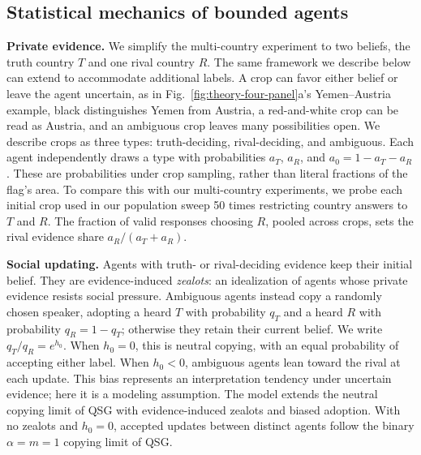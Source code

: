 \subsection[Statistical mechanics of bounded agents]{Statistical mechanics of bounded agents}
\label{sec:stat-mech}


\textbf{Private evidence.} We simplify the multi-country experiment to two beliefs, the truth country \(T\) and one rival country \(R\). The same framework we describe below can extend to accommodate additional labels. A crop can favor either belief or leave the agent uncertain, as in Fig.~\ref{fig:theory-four-panel}a's Yemen--Austria example, black distinguishes Yemen from Austria, a red-and-white crop can be read as Austria, and an ambiguous crop leaves many possibilities open. We describe crops as three types: truth-deciding, rival-deciding, and ambiguous. Each agent independently draws a type with probabilities \(a_T\), \(a_R\), and \(a_0=1-a_T-a_R\). These are probabilities under crop sampling, rather than literal fractions of the flag's area. To compare this with our multi-country experiments, we probe each initial crop used in our population sweep 50 times restricting country answers to \(T\) and \(R\). The fraction of valid responses choosing \(R\), pooled across crops, sets the rival evidence share \(a_R/(a_T+a_R)\).

\textbf{Social updating.} Agents with truth- or rival-deciding evidence keep their initial belief. They are evidence-induced \emph{zealots}: an idealization of agents whose private evidence resists social pressure. Ambiguous agents instead copy a randomly chosen speaker, adopting a heard \(T\) with probability \(q_T\) and a heard \(R\) with probability \(q_R=1-q_T\); otherwise they retain their current belief. We write \(q_T/q_R=e^{h_0}\). When \(h_0=0\), this is neutral copying, with an equal probability of accepting either label. When \(h_0<0\), ambiguous agents lean toward the rival at each update. This bias represents an interpretation tendency under uncertain evidence; here it is a modeling assumption. The model extends the neutral copying limit of QSG \citep{tanaka2026lottery} with evidence-induced zealots \citep{mobilia2003zealot,mobilia2007zealotry} and biased adoption. With no zealots and \(h_0=0\), accepted updates between distinct agents follow the binary \(\alpha=m=1\) copying limit of QSG.

